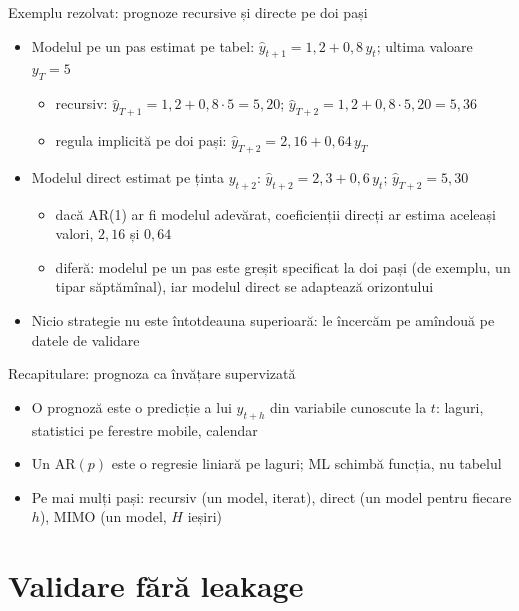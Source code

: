 \begin{frame}{Exemplu rezolvat: prognoze recursive și directe pe doi pași}
\itemsize{\small}
\begin{itemize}
    \item Modelul pe un pas estimat pe tabel: $\hat y_{t+1} = 1{,}2 + 0{,}8\,y_t$; ultima valoare $y_T = 5$
    \begin{itemize}
        \item recursiv: $\hat y_{T+1} = 1{,}2 + 0{,}8 \cdot 5 = 5{,}20$; \quad $\hat y_{T+2} = 1{,}2 + 0{,}8 \cdot 5{,}20 = 5{,}36$
        \item regula implicită pe doi pași: $\hat y_{T+2} = 2{,}16 + 0{,}64\,y_T$
    \end{itemize}
    \item Modelul direct estimat pe ținta $y_{t+2}$: $\hat y_{t+2} = 2{,}3 + 0{,}6\,y_t$; \quad $\hat y_{T+2} = 5{,}30$
    \begin{itemize}
        \item dacă AR(1) ar fi modelul adevărat, coeficienții direcți ar estima aceleași valori, $2{,}16$ și $0{,}64$
        \item diferă: modelul pe un pas este greșit specificat la doi pași (de exemplu, un tipar săptămînal), iar modelul direct se adaptează orizontului
    \end{itemize}
    \item Nicio strategie nu este întotdeauna superioară: le încercăm pe amîndouă pe datele de validare
\end{itemize}
\end{frame}

\begin{frame}{Recapitulare: prognoza ca învățare supervizată}
\itemsize{\small}
\begin{itemize}
    \item O prognoză este o predicție a lui $y_{t+h}$ din variabile cunoscute la $t$: laguri, statistici pe ferestre mobile, calendar
    \item Un AR$(p)$ este o regresie liniară pe laguri; ML schimbă funcția, nu tabelul
    \item Pe mai mulți pași: recursiv (un model, iterat), direct (un model pentru fiecare $h$), MIMO (un model, $H$ ieșiri)
\end{itemize}
\end{frame}


\section{Validare fără leakage}

